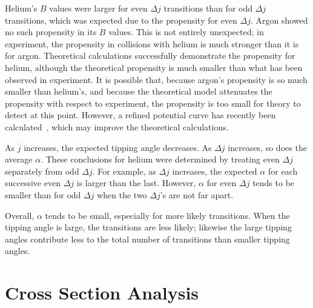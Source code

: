 \documentclass[letterpaper,11pt]{article}
\begin{document}
Helium's $B$ values were larger for even $\Delta j$ transitions than for odd
$\Delta j$ transitions, which was expected due to the propensity for even
$\Delta j$.  Argon showed no such propensity in its $B$ values.  This is not
entirely unexpected; in experiment, the propensity in collisions with helium is
much stronger than it is for argon.  Theoretical calculations successfully
demonstrate the propensity for helium, although the theoretical propensity is
much smaller than what has been observed in experiment.  It is possible that,
because argon's propensity is so much smaller than helium's, and because the
theoretical model attenuates the propensity with respect to experiment, the
propensity is too small for theory to detect at this point.  However, a refined
potential curve has recently been calculated~\cite{Pri15}, which may improve
the theoretical calculations.

As $\overline j$ increases, the expected tipping angle decreases.  As $\Delta
j$ increases, so does the average $\alpha$.  These conclusions for helium were
determined by treating even $\Delta j$ separately from odd $\Delta j$. For
example, as $\Delta j$ increases, the expected $\alpha$ for each successive
even $\Delta j$ is larger than the last. However, $\alpha$ for even $\Delta j$
tends to be smaller than for odd $\Delta j$ when the two $\Delta j$'s are not
far apart.

Overall, $\alpha$ tends to be small, especially for more likely transitions.
When the tipping angle is large, the transitions are less likely; likewise the
large tipping angles contribute less to the total number of transitions than
smaller tipping angles.

\section{Cross Section Analysis}
\end{document}
